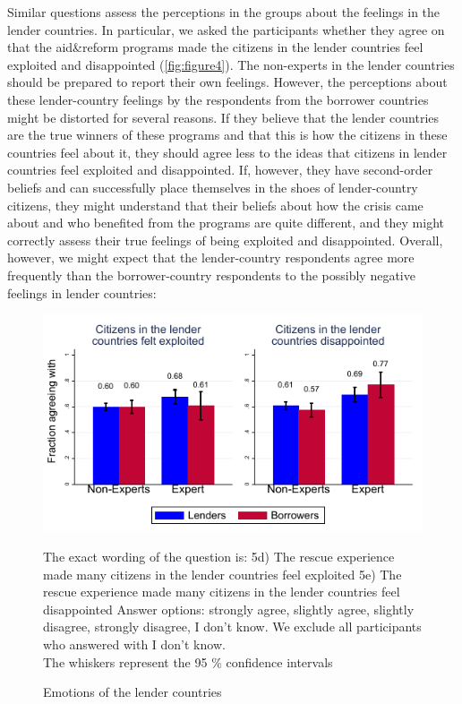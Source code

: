 Similar questions assess the perceptions in the groups about the
feelings in the lender countries. In particular, we asked the participants whether they
agree on that the aid\&reform programs made the citizens in the
lender countries feel exploited and disappointed (\autoref{fig:figure4}). The non-experts in the lender
countries should be prepared to report their own feelings. However, the
perceptions about these lender-country feelings by the respondents from the
borrower countries might be distorted for several reasons. If they believe
that the lender countries are the true winners of these programs and that
this is how the citizens in these countries feel about it, they should agree
less to the ideas that citizens in lender countries feel exploited and
disappointed. If, however, they have second-order beliefs and can
successfully place themselves in the shoes of lender-country citizens, they
might understand that their beliefs about how the crisis came about and who
benefited from the programs are quite different, and they might correctly
assess their true feelings of being exploited and disappointed. Overall,
however, we might expect that the lender-country respondents agree more
frequently than the borrower-country respondents to the possibly negative
feelings in lender countries:

\begin{figure}[h!]
  \begin{center}
       \caption{Emotions of the lender countries}
    \includegraphics[scale=1.2]{graph5_2.pdf}
 
    \label{fig:figure4}
    \end{center}
    \tiny
    \begin{tablenotes}
     {The exact wording of the question is: 5d) The rescue experience made many citizens in the lender countries feel exploited 5e) The rescue experience made many citizens in the lender countries feel disappointed
    Answer options: strongly agree, slightly agree, slightly disagree, strongly disagree, I don't know. We exclude all participants who answered with I don't know. \\
    The whiskers represent the 95 \% confidence intervals}
    \end{tablenotes}
\end{figure}


